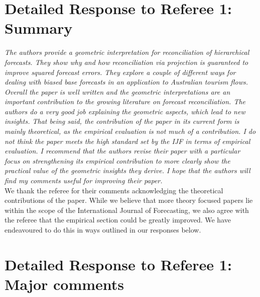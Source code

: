 \documentclass[a4paper,11pt]{article}
\begin{document}
	
	
	\section*{Detailed Response to Referee 1: Summary}
	
	\textit{The authors provide a geometric interpretation for reconciliation of hierarchical forecasts. They show why and how reconciliation via projection is guaranteed to improve squared forecast errors. They explore a couple of different ways for dealing with biased base forecasts in an application to Australian tourism flows. Overall the paper is well written and the geometric interpretations are an important contribution to the growing literature on forecast reconciliation. The	authors do a very good job explaining the geometric aspects, which lead to new insights. That being said, the contribution of the paper in its current form is mainly theoretical, as the empirical evaluation is not much of a contribution.  I do not think the paper meets the high standard set by the IJF in terms of empirical evaluation. I recommend that the authors revise their paper with a particular focus on strengthening its empirical contribution to more clearly show the practical value of the geometric insights they derive. I hope that the authors will find my comments useful for improving their paper.}\\
		
	We thank the referee for their comments acknowledging the theoretical contributions of the paper.  While we believe that more theory focused papers lie within the scope of the International Journal of Forecasting, we also agree with the referee that the empirical section could be greatly improved.  We have endeavoured to do this in ways outlined in our responses below.\\
	
	\section*{Detailed Response to Referee 1: Major comments}
	
\end{document}
